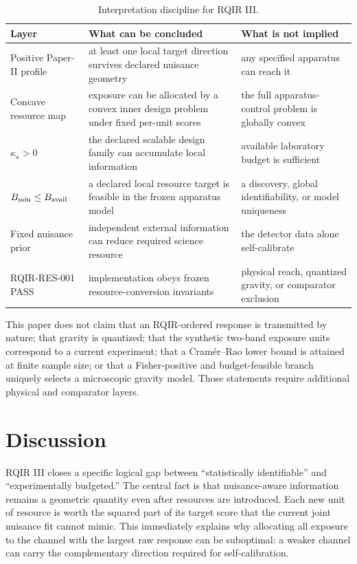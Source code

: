 \begin{table}[t]
\caption{Interpretation discipline for RQIR III.}
\label{tab:claims}
\begin{ruledtabular}
\begin{tabular}{p{}p{}p{}}
Layer & What can be concluded & What is not implied\\
\hline
Positive Paper-II profile & at least one local target direction survives declared nuisance geometry & any specified apparatus can reach it\\
Concave resource map & exposure can be allocated by a convex inner design problem under fixed per-unit scores & the full apparatus-control problem is globally convex\\
$\kappa_\star>0$ & the declared scalable design family can accumulate local information & available laboratory budget is sufficient\\
$B_{\min}\le B_{\rm avail}$ & a declared local resource target is feasible in the frozen apparatus model & a discovery, global identifiability, or model uniqueness\\
Fixed nuisance prior & independent external information can reduce required science resource & the detector data alone self-calibrate\\
RQIR-RES-001 PASS & implementation obeys frozen resource-conversion invariants & physical reach, quantized gravity, or comparator exclusion\\
\end{tabular}
\end{ruledtabular}
\end{table}

This paper does not claim that an RQIR-ordered response is transmitted by nature; that gravity is quantized; that the synthetic two-band exposure units correspond to a current experiment; that a Cram\'er--Rao lower bound is attained at finite sample size; or that a Fisher-positive and budget-feasible branch uniquely selects a microscopic gravity model. Those statements require additional physical and comparator layers.

\section{Discussion}
\label{sec:discussion}

RQIR III closes a specific logical gap between ``statistically identifiable'' and ``experimentally budgeted.'' The central fact is that nuisance-aware information remains a geometric quantity even after resources are introduced. Each new unit of resource is worth the squared part of its target score that the current joint nuisance fit cannot mimic. This immediately explains why allocating all exposure to the channel with the largest raw response can be suboptimal: a weaker channel can carry the complementary direction required for self-calibration.

